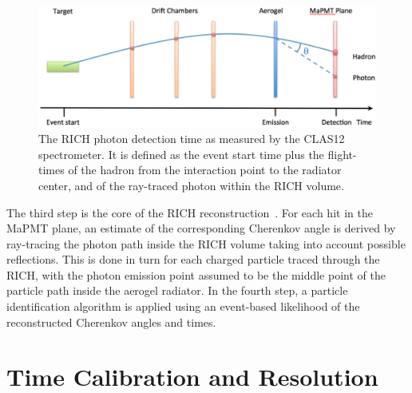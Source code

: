 \documentclass[5p,times,twocolumn]{elsarticle}
\begin{document}
\begin{figure}[t]
\begin{center}
\includegraphics[width=1.0\columnwidth]{Tracking_time.png}
\end{center}
\caption{The RICH photon detection time as measured by the  CLAS12 spectrometer. It is defined as the event start
  time plus the flight-times of the hadron from the interaction point to the radiator center, and of the ray-traced
  photon within the RICH volume.}
\label{Fig:Traced_Time}
\end{figure}

The third step is the core of the RICH reconstruction~\cite{recon-nim}. For each hit in the MaPMT plane, an
estimate of the corresponding Cherenkov angle is derived by ray-tracing the photon path inside the RICH volume
taking into account possible reflections. This is done in turn for each charged particle traced through the RICH, with
the photon emission point assumed to be the middle point of the particle path inside the aerogel radiator. In the fourth
step, a particle identification algorithm is applied using an event-based likelihood of the reconstructed Cherenkov
angles and times.

\section{Time Calibration and Resolution}
\label{sec:TimeCalib}
\end{document}

